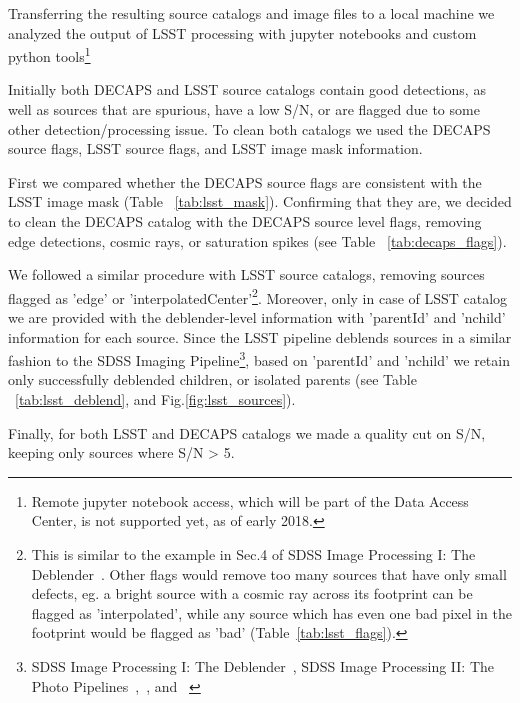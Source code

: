 \documentclass[DM,lsstdraft,toc,usenatbib,authoryear]{lsstdoc}
\begin{document}
Transferring the resulting source catalogs and image files to a local machine we analyzed the output of LSST processing with jupyter notebooks and custom python tools\footnote{Remote jupyter notebook access, which will be part of the Data Access Center, is not supported yet, as of early 2018.}

Initially both DECAPS and LSST source catalogs contain good detections, as well as sources that are spurious, have a low S/N, or  are flagged due to some other detection/processing issue.  To clean both catalogs we used the DECAPS source flags, LSST source flags, and LSST image mask information.

First we compared whether the  DECAPS source flags are consistent with the LSST image mask (Table ~\ref{tab:lsst_mask}). Confirming that they are, we decided to clean the DECAPS catalog with the DECAPS source level flags, removing edge detections, cosmic rays, or saturation spikes (see Table ~\ref{tab:decaps_flags}).

We followed a similar procedure with LSST source catalogs, removing sources flagged as 'edge' or 'interpolatedCenter'\footnote{This is similar to the example in Sec.4 of SDSS Image Processing I: The Deblender~\citep{lupton2005}. Other flags would remove too many sources that have only small defects, eg. a bright source with a cosmic ray across its footprint can be flagged as 'interpolated',  while any source which has even one bad pixel in the footprint would be flagged as 'bad' (Table~\ref{tab:lsst_flags}). }.  Moreover, only in case of LSST catalog we are provided with the deblender-level information with 'parentId' and 'nchild' information for each source. Since the LSST pipeline deblends sources in a similar fashion to the SDSS Imaging Pipeline\footnote{SDSS Image Processing I: The Deblender~\citep{lupton2005}, SDSS Image Processing II: The Photo Pipelines~\citep{lupton2001},~\citep{lupton2002}, and ~\citep{lupton2005a}}, based on 'parentId' and 'nchild' we retain only successfully deblended children, or isolated parents (see Table ~\ref{tab:lsst_deblend}, and Fig.\ref{fig:lsst_sources}).

Finally, for both LSST and  DECAPS catalogs we made a quality cut on S/N, keeping only sources where S/N > 5.
\end{document}
